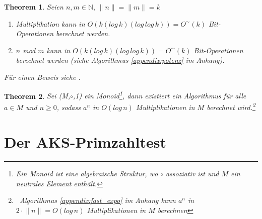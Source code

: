 \documentclass[12pt,oneside]{article}
\newtheorem{theorem}{Theorem}[section]
\theoremstyle{remark}
\theoremstyle{definition}
\begin{document}
\begin{theorem}\label{fact_2}
Seien $n,m \in \mathbb{N}, \, \lVert n \rVert = \lVert m \rVert =k$
\begin{enumerate}
\itemsep0.6em 
    \item Multiplikation kann in $O(k (log \, k)(log \, log \, k)) = O^{\sim}(k)$ Bit-Operationen berechnet werden.\newline
    \item $n$ mod $m$ kann in $O(k (log \, k)(log \, log \, k)) = O^{\sim}(k)$ Bit-Operationen berechnet werden (siehe Algorithmus \ref{appendix:potenz} im Anhang).\newline
\end{enumerate}
Für einen Beweis siehe \cite{D73}.
\end{theorem}
\begin{theorem}\label{poly_mult}
Sei (M,$\circ$,1) ein Monoid\footnote{Ein Monoid ist eine algebraische Struktur, wo $\circ$ assoziativ ist und $M$ ein neutrales Element enthält. }, dann existiert ein Algorithmus für alle $a \in  M$ und $n \geq 0$, sodass $a^n$ in $O(log \, n)$ Multiplikationen in $M$ berechnet wird.\footnote{$\,$ Algorithmus \ref{appendix:fast_expo} im Anhang kann $a^n$ in $2\cdot \lVert n \rVert = O(log \, n)$ Multiplikationen in $M$ berechnen}
\end{theorem}


\newpage

\section{Der AKS-Primzahltest}
\end{document}
